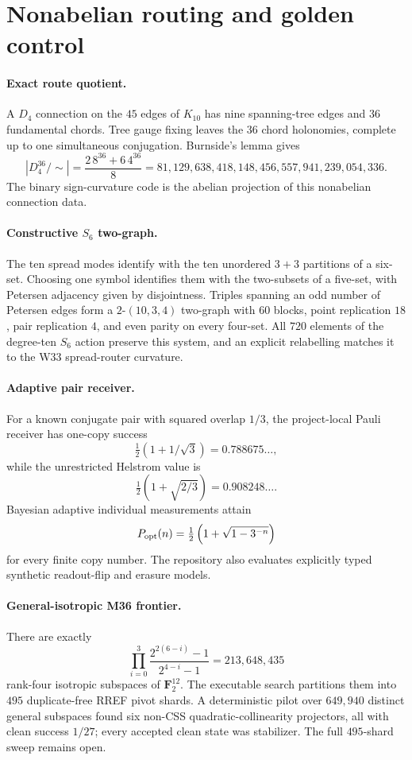 \section{Nonabelian routing and golden control}
\label{sec:bt2974-bt2983}

\paragraph{Exact route quotient.}
A $D_4$ connection on the $45$ edges of $K_{10}$ has nine spanning-tree edges and
$36$ fundamental chords.  Tree gauge fixing leaves the $36$ chord holonomies,
complete up to one simultaneous conjugation.  Burnside's lemma gives
\[
\left|D_4^{36}/\!\sim\right|=\frac{2\,8^{36}+6\,4^{36}}8
=81{,}129{,}638{,}418{,}148{,}456{,}557{,}941{,}239{,}054{,}336.
\]
The binary sign-curvature code is the abelian projection of this nonabelian
connection data.

\paragraph{Constructive $S_6$ two-graph.}
The ten spread modes identify with the ten unordered $3+3$ partitions of a
six-set.  Choosing one symbol identifies them with the two-subsets of a five-set,
with Petersen adjacency given by disjointness.  Triples spanning an odd number of
Petersen edges form a $2$-$(10,3,4)$ two-graph with $60$ blocks, point replication
$18$, pair replication $4$, and even parity on every four-set.  All $720$ elements
of the degree-ten $S_6$ action preserve this system, and an explicit relabelling
matches it to the W33 spread-router curvature.

\paragraph{Adaptive pair receiver.}
For a known conjugate pair with squared overlap $1/3$, the project-local Pauli
receiver has one-copy success
\[
\tfrac12(1+1/\sqrt3)=0.788675\ldots,
\]
while the unrestricted Helstrom value is
\[
\tfrac12(1+\sqrt{2/3})=0.908248\ldots.
\]
Bayesian adaptive individual measurements attain
\[
P_{\rm opt}(n)=\tfrac12\left(1+\sqrt{1-3^{-n}}\right)
\]
for every finite copy number.  The repository also evaluates explicitly typed
synthetic readout-flip and erasure models.

\paragraph{General-isotropic M36 frontier.}
There are exactly
\[
\prod_{i=0}^{3}\frac{2^{2(6-i)}-1}{2^{4-i}-1}=213{,}648{,}435
\]
rank-four isotropic subspaces of $\mathbf F_2^{12}$.  The executable search
partitions them into $495$ duplicate-free RREF pivot shards.  A deterministic
pilot over $649{,}940$ distinct general subspaces found six non-CSS
quadratic-collinearity projectors, all with clean success $1/27$; every accepted
clean state was stabilizer.  The full $495$-shard sweep remains open.

